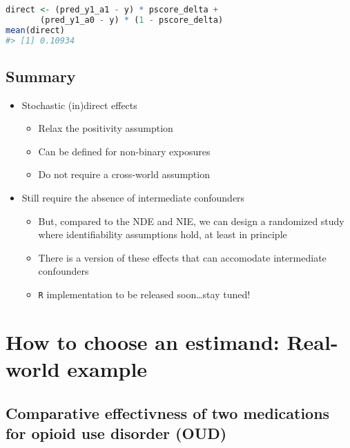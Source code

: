 \documentclass[
  12pt,
]{book}
\newcommand{\passthrough}[1]{#1}
\providecommand{\tightlist}{%
  \setlength{\itemsep}{0pt}\setlength{\parskip}{0pt}}
\theoremstyle{definition}
\theoremstyle{definition}
\theoremstyle{definition}
\newcommand{\1}{\mathbbm{1}}
\begin{document}
\begin{lstlisting}[language=R]
direct <- (pred_y1_a1 - y) * pscore_delta +
       (pred_y1_a0 - y) * (1 - pscore_delta)
mean(direct)
#> [1] 0.10934
\end{lstlisting}

\hypertarget{summary}{%
\section{Summary}\label{summary}}

\begin{itemize}
\tightlist
\item
  Stochastic (in)direct effects

  \begin{itemize}
  \tightlist
  \item
    Relax the positivity assumption
  \item
    Can be defined for non-binary exposures
  \item
    Do not require a cross-world assumption
  \end{itemize}
\item
  Still require the absence of intermediate confounders

  \begin{itemize}
  \tightlist
  \item
    But, compared to the NDE and NIE, we can design a randomized study where
    identifiability assumptions hold, at least in principle
  \item
    There is a version of these effects that can accomodate intermediate
    confounders \citep{hejazi2020nonparametric}
  \item
    \passthrough{\lstinline!R!} implementation to be released soon\ldots stay tuned!
  \end{itemize}
\end{itemize}

\hypertarget{estimandirl}{%
\chapter{How to choose an estimand: Real-world example}\label{estimandirl}}

\hypertarget{comparative-effectivness-of-two-medications-for-opioid-use-disorder-oud}{%
\section{Comparative effectivness of two medications for opioid use disorder (OUD)}\label{comparative-effectivness-of-two-medications-for-opioid-use-disorder-oud}}
\end{document}
